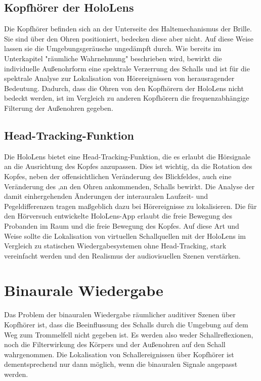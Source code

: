 \subsection{Kopfhörer der HoloLens}
Die Kopfhörer befinden sich an der Unterseite des Haltemechanismus der Brille. Sie sind über den Ohren positioniert, bedecken diese aber nicht. Auf diese Weise lassen sie die Umgebungsgeräusche ungedämpft durch. Wie bereits im Unterkapitel "räumliche Wahrnehmung" beschrieben wird, bewirkt die individuelle Außenohrform eine spektrale Verzerrung des Schalls und ist für die spektrale Analyse zur Lokalisation von Hörereignissen von herausragender Bedeutung. Dadurch, dass die Ohren von den Kopfhörern der HoloLens nicht bedeckt werden, ist im Vergleich zu anderen Kopfhörern die frequenzabhängige Filterung der Außenohren gegeben. 

\newpage
\subsection{Head-Tracking-Funktion}
Die HoloLens bietet eine Head-Tracking-Funktion, die es erlaubt die Hörsignale an die Ausrichtung des Kopfes anzupassen. Dies ist wichtig, da die Rotation des Kopfes, neben der offensichtlichen Veränderung des Blickfeldes, auch eine Veränderung des ,an den Ohren ankommenden, Schalls bewirkt. Die Analyse der damit einhergehenden Änderungen der interauralen Laufzeit- und Pegeldifferenzen tragen maßgeblich dazu bei Hörereignisse zu lokalisieren. Die für den Hörversuch entwickelte HoloLens-App erlaubt die freie Bewegung des Probanden im Raum und die freie Bewegung des Kopfes. Auf diese Art und Weise sollte die Lokalisation von virtuellen Schallquellen mit der HoloLens im Vergleich zu statischen Wiedergabesystemen ohne Head-Tracking, stark vereinfacht werden und den Realismus der audiovisuellen Szenen verstärken.  
  
\section{Binaurale Wiedergabe}
 Das Problem der binauralen Wiedergabe räumlicher auditiver Szenen über Kopfhörer ist, dass die Beeinflussung des Schalls durch die Umgebung auf dem Weg zum Trommelfell nicht gegeben ist. Es werden also weder Schallreflexionen, noch die Filterwirkung des Körpers und der Außenohren auf den Schall wahrgenommen. Die Lokalisation von Schallereignissen über Kopfhörer ist dementsprechend nur dann möglich, wenn die binauralen Signale angepasst werden. 
 
